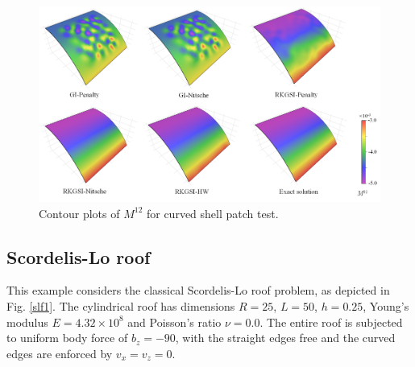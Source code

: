 \begin{figure}[!ht]
\centering
\DIFdelbeginFL %
\DIFdelendFL \DIFaddbeginFL \includegraphics[width=\textwidth]{figures/ptc_r2}
\DIFaddendFL \caption{Contour plots of $M^{12}$ for curved shell patch test.}\label{ptf2}
\end{figure}

\subsection{Scordelis-Lo roof}
This example considers the classical Scordelis-Lo roof problem, as depicted in Fig. \ref{slf1}. The cylindrical roof has dimensions $R=25$, $L=50$, $h=0.25$, Young's modulus $E=4.32\times 10^8$ and Poisson's ratio $\nu=0.0$. The entire roof is subjected to \DIFdelbegin {}\DIFdelend \DIFaddbegin {}\DIFaddend uniform body force of $b_z = -90$, with the straight edges \DIFdelbegin {}\DIFdelend \DIFaddbegin {}\DIFaddend free and the \DIFdelbegin {}\DIFdelend curved edges are enforced by $v_x=v_z=0$.

